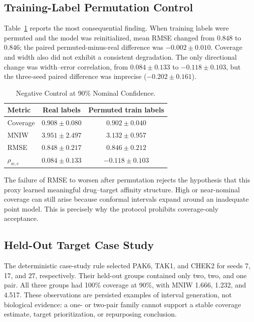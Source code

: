 \documentclass[lettersize,journal]{IEEEtran}
\begin{document}
\subsection{Training-Label Permutation Control}
\label{sec:negative}
Table~\ref{tab:negative} reports the most consequential finding. When training labels were permuted and the model was reinitialized, mean RMSE changed from $0.848$ to $0.846$; the paired permuted-minus-real difference was $-0.002\pm0.010$. Coverage and width also did not exhibit a consistent degradation. The only directional change was width--error correlation, from $0.084\pm0.133$ to $-0.118\pm0.103$, but the three-seed paired difference was imprecise ($-0.202\pm0.161$).

\begin{table}[!t]
\caption{Negative Control at 90\% Nominal Confidence.}
\label{tab:negative}
\centering
\begin{tabular}{lcc}
\toprule
Metric & Real labels & Permuted train labels \\
\midrule
Coverage & $0.908\pm0.080$ & $0.902\pm0.040$ \\
MNIW & $3.951\pm2.497$ & $3.132\pm0.957$ \\
RMSE & $0.848\pm0.217$ & $0.846\pm0.212$ \\
$\rho_{w,e}$ & $0.084\pm0.133$ & $-0.118\pm0.103$ \\
\bottomrule
\end{tabular}
\end{table}

The failure of RMSE to worsen after permutation rejects the hypothesis that this proxy learned meaningful drug--target affinity structure. High or near-nominal coverage can still arise because conformal intervals expand around an inadequate point model. This is precisely why the protocol prohibits coverage-only acceptance.

\subsection{Held-Out Target Case Study}
The deterministic case-study rule selected PAK6, TAK1, and CHEK2 for seeds 7, 17, and 27, respectively. Their held-out groups contained only two, two, and one pair. All three groups had 100\% coverage at 90\%, with MNIW 1.666, 1.232, and 4.517. These observations are persisted examples of interval generation, not biological evidence: a one- or two-pair family cannot support a stable coverage estimate, target prioritization, or repurposing conclusion.
\end{document}
